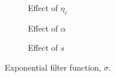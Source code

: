 \begin{figure}[htb]
  \begin{centering}
    \begin{subfigure}{2.0in}
      \caption{Effect of $\eta_c$}
      \label{FIG:Filter_etac}
    \end{subfigure}%
    \begin{subfigure}{2.0in}
      \caption{Effect of $\alpha$}
      \label{FIG:Filter_alpha}
    \end{subfigure}%
    \begin{subfigure}{2.0in}
      \caption{Effect of $s$}
      \label{FIG:Filter_s}
    \end{subfigure}%
    \caption{Exponential filter function, $\sigma$.}
    \label{FIG:Filter}
  \end{centering}
\end{figure}

